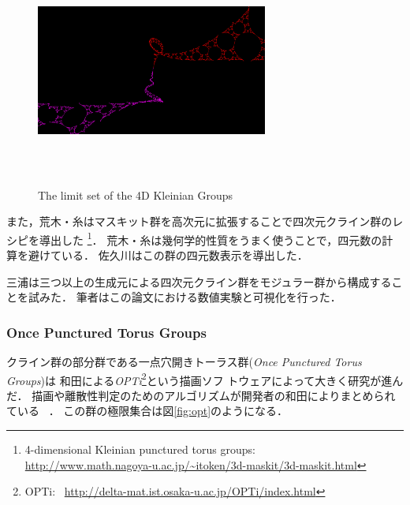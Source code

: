 \begin{figure}[h!tbp]
\begin{minipage}{0.49\hsize}
  \subcaption{}
 \end{minipage}
 \hspace*{\fill}
 \begin{minipage}{0.49\hsize}
  \center
  \includegraphics[width=3in, height=3in, keepaspectratio]{../img/klein/sakugawa4.pdf}
  \subcaption{}
 \end{minipage}
 \caption{The limit set of the 4D Kleinian Groups}
 \label{fig:sakugawa}
\end{figure}

また，荒木・糸はマスキット群を高次元に拡張することで四次元クライン群のレ
シピを導出した\cite{araki2008extension}
\footnote{4-dimensional Kleinian punctured torus groups:\\
\url{http://www.math.nagoya-u.ac.jp/~itoken/3d-maskit/3d-maskit.html}}．
荒木・糸は幾何学的性質をうまく使うことで，四元数の計算を避けている．
佐久川はこの群の四元数表示を導出した\cite{sakugawa2010limit}．

三浦は三つ以上の生成元による四次元クライン群をモジュラー群から構成するこ
とを試みた\cite{miura2015master}．
筆者はこの論文における数値実験と可視化を行った．

\subsubsection{Once Punctured Torus Groups}

クライン群の部分群である一点穴開きトーラス群({\it Once Punctured Torus Groups})は
和田による{\it OPTi}\footnote{OPTi:~
\url{http://delta-mat.ist.osaka-u.ac.jp/OPTi/index.html}}という描画ソフ
トウェアによって大きく研究が進んだ．
描画や離散性判定のためのアルゴリズムが開発者の和田によりまとめられている
\cite{wada2003optiDrawingLimit}~\cite{wada2006optiDiscreteness}．
この群の極限集合は図\ref{fig:opt}のようになる．

